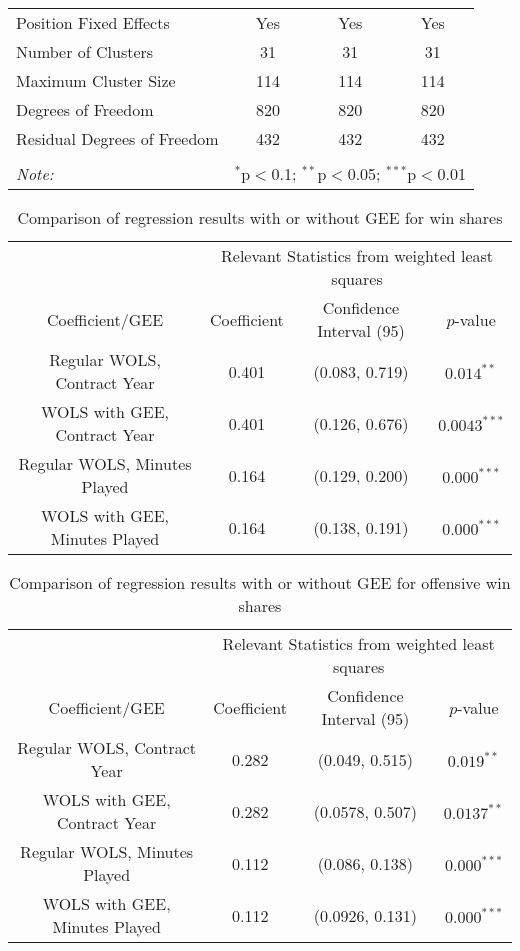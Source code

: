 \documentclass[12pt]{article}
\begin{document}
\begin{landscape}
\begin{table}[!htbp]
\begin{tabular}{@{\extracolsep{5pt}}lccc}
			Position Fixed Effects & Yes & Yes & Yes \\ 
			Number of Clusters & 31 & 31 & 31 \\ 
			Maximum Cluster Size & 114 & 114 & 114 \\ 
			Degrees of Freedom & 820 & 820 & 820 \\ 
			Residual Degrees of Freedom & 432 & 432 & 432 \\ 
			\hline 
			\hline \\[-1.8ex] 
			\textit{Note:}  & \multicolumn{3}{r}{$^{*}$p$<$0.1; $^{**}$p$<$0.05; $^{***}$p$<$0.01} \\ 
		\end{tabular} 
	\end{table}
	\end{landscape}

	\begin{table}[!htbp]
		\centering
		\caption{Comparison of regression results with or without GEE for win shares}
		\label{geelmcomparison} 
		\begin{tabular}{*4c}
			\toprule
			& \multicolumn{3}{c}{Relevant Statistics from weighted least squares} \\
			\cmidrule(lr){2-4}
			Coefficient/GEE & Coefficient  & Confidence Interval (95) & $p$-value \\
			\midrule
			Regular WOLS, Contract Year & 0.401       & (0.083, 0.719) & $0.014^{**}$       \\
			WOLS with GEE, Contract Year & 0.401      & (0.126, 0.676)       & $0.0043^{***}$ \\
			Regular WOLS, Minutes Played & 0.164       & (0.129, 0.200) & $0.000^{***}$ \\
			WOLS with GEE, Minutes Played & 0.164 & (0.138, 0.191)       & $0.000^{***}$       \\
			\bottomrule
		\end{tabular}
	\end{table}

	\begin{table}[!htbp]
		\centering
		\caption{Comparison of regression results with or without GEE for offensive win shares}
		\label{geelmcomparisonw} 
		\begin{tabular}{*4c}
			\toprule
			& \multicolumn{3}{c}{Relevant Statistics from weighted least squares} \\
			\cmidrule(lr){2-4}
			Coefficient/GEE & Coefficient  & Confidence Interval (95) & $p$-value \\
			\midrule
			Regular WOLS, Contract Year & 0.282       & (0.049, 0.515) & $0.019^{**}$       \\
			WOLS with GEE, Contract Year & 0.282      & (0.0578, 0.507)       & $0.0137^{**}$ \\
			Regular WOLS, Minutes Played & 0.112       & (0.086, 0.138) & $0.000^{***}$ \\
			WOLS with GEE, Minutes Played & 0.112 & (0.0926, 0.131)       & $0.000^{***}$       \\
			\bottomrule
		\end{tabular}
	\end{table}
\end{document}
